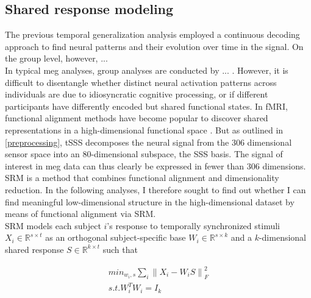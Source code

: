 \subsection{Shared response modeling}
The previous temporal generalization analysis employed a continuous decoding approach to find neural patterns and their evolution over time in the signal.
On the group level, however, ... \\
In typical \gls{meg} analyses, group analyses are conducted by ... .
However, it is difficult to disentangle whether distinct neural activation patterns across individuals are due to idiosyncratic cognitive processing, or if different participants have differently encoded but shared functional states.
In \gls{fMRI}, functional alignment methods have become popular to discover shared representations in a high-dimensional functional space \citep{haxby2020hyperalignment}.
But as outlined in \ref{preprocessing}, \gls{tSSS} decomposes the neural signal from the 306 dimensional sensor space into an 80-dimensional subspace, the \gls{SSS} basis.
The signal of interest in \gls{meg} data can thus clearly be expressed in fewer than 306 dimensions.
\gls{SRM} \citep{NIPS2015_b3967a0e} is a method that combines functional alignment and dimensionality reduction.
In the following analyses, I therefore sought to find out whether I can find meaningful low-dimensional structure in the high-dimensional dataset by means of functional alignment via \gls{SRM}.\\
\gls{SRM} models each subject $i$'s response to temporally synchronized stimuli $X_i \in \mathbb{R}^{s \times t}$ as an orthogonal subject-specific base $W_i \in \mathbb{R}^{s\times k}$ and a $k$-dimensional shared response $S \in \mathbb{R}^{k \times t}$ such that


\begin{equation}
	\begin{aligned}
		min_{w_i, s}\sum_i{\|X_i - W_iS \|}^2_F \\
		s.t. W^T_iW_i = I_k
	\end{aligned}
	\label{eq:srm}
\end{equation}

